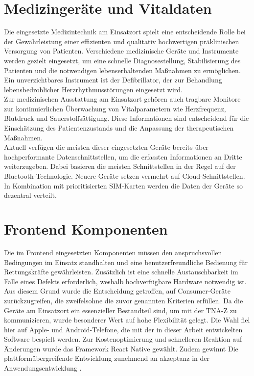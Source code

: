 \section{Medizingeräte und Vitaldaten}
Die eingesetzte Medizintechnik am Einsatzort spielt 
eine entscheidende Rolle bei der Gewährleistung einer effizienten
und qualitativ hochwertigen präklinischen Versorgung von Patienten. 
Verschiedene medizinische Geräte und Instrumente werden gezielt eingesetzt, 
um eine schnelle Diagnosestellung, Stabilisierung des Patienten und die 
notwendigen lebenserhaltenden Maßnahmen zu ermöglichen.\\

Ein unverzichtbares Instrument ist der Defibrillator, der zur Behandlung
lebensbedrohlicher Herzrhythmusstörungen eingesetzt wird.\\

Zur medizinischen Ausstattung am Einsatzort gehören auch tragbare
Monitore zur kontinuierlichen Überwachung von Vitalparametern wie
Herzfrequenz, Blutdruck und Sauerstoffsättigung. Diese Informationen
sind entscheidend für die Einschätzung des Patientenzustands und die
Anpassung der therapeutischen Maßnahmen.\\

Aktuell verfügen die meisten dieser eingesetzten Geräte bereits
über hochperformante Datenschnittstellen, um die erfassten Informationen
an Dritte weiterzugeben. Dabei basieren die meisten Schnittstellen in der
Regel auf der Bluetooth-Technologie. Neuere Geräte setzen vermehrt auf
Cloud-Schnittstellen. In Kombination mit prioritisierten SIM-Karten werden
die Daten der Geräte so dezentral verteilt.\\

\section{Frontend Komponenten}
Die im Frontend eingesetzten Komponenten müssen den
anspruchsvollen Bedingungen im Einsatz standhalten und eine
benutzerfreundliche Bedienung für Rettungskräfte gewährleisten. 
Zusätzlich ist eine schnelle Austauschbarkeit im Falle eines Defekts
erforderlich, weshalb hochverfügbare Hardware notwendig ist. 
Aus diesem Grund wurde die Entscheidung getroffen, auf Consumer-Geräte 
zurückzugreifen, die zweifelsohne die zuvor genannten Kriterien erfüllen. 
Da die Geräte am Einsatzort ein essenzieller Bestandteil sind, um mit der 
\ac{TNA-Z} zu kommunizieren, wurde besonderer Wert auf hohe Flexibilität gelegt. 
Die Wahl fiel hier auf Apple- und Android-Telefone, die mit der in dieser Arbeit 
entwickelten Software bespielt werden. Zur Kostenoptimierung und schnelleren
Reaktion auf Änderungen wurde das Framework React Native gewählt. Zudem 
gewinnt Die plattformübergreifende Entwicklung zunehmend an akzeptanz in der Anwendungsentwicklung \cite{bertels2023kategorisierung}.\\

